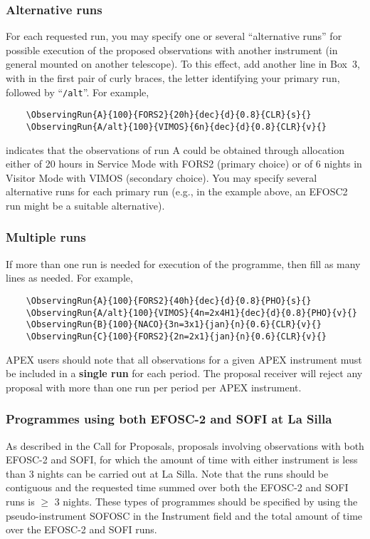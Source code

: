 \documentclass{article}
\begin{document}
\subsubsection*{Alternative runs}
For each requested run, you may specify one or several
``alternative runs'' for possible execution of the proposed
observations with another instrument (in general mounted on another
telescope). To this effect, add another line in Box~3, with in the
first pair of curly braces, the letter identifying your primary run,
followed by ``\verb|/alt|''. For example,
\begin{verbatim}
    \ObservingRun{A}{100}{FORS2}{20h}{dec}{d}{0.8}{CLR}{s}{}
    \ObservingRun{A/alt}{100}{VIMOS}{6n}{dec}{d}{0.8}{CLR}{v}{}
\end{verbatim}
indicates that the observations of run A could be obtained
through allocation either of 20 hours in Service Mode with FORS2
(primary choice) or of 6 nights in Visitor Mode with VIMOS (secondary
choice). You may specify several alternative runs for each primary run
(e.g., in the example above, an EFOSC2 run might be a suitable alternative).

\subsubsection*{Multiple runs}
If more than one run is needed for execution of
the programme, then fill as many lines as needed.  For example,
\begin{verbatim} 
    \ObservingRun{A}{100}{FORS2}{40h}{dec}{d}{0.8}{PHO}{s}{}
    \ObservingRun{A/alt}{100}{VIMOS}{4n=2x4H1}{dec}{d}{0.8}{PHO}{v}{}
    \ObservingRun{B}{100}{NACO}{3n=3x1}{jan}{n}{0.6}{CLR}{v}{}
    \ObservingRun{C}{100}{FORS2}{2n=2x1}{jan}{n}{0.6}{CLR}{v}{}
\end{verbatim}

APEX users should note that all observations for a given APEX
instrument must be included in a {\bf single run} for each period. The proposal
receiver 
will reject any proposal with more than one run per period per APEX instrument. 

\subsubsection*{Programmes using both EFOSC-2 and SOFI at La Silla}
\label{sec:sofiefosc}

As described in the Call for Proposals,
proposals involving observations with both EFOSC-2 and SOFI,
for which the amount of time with either instrument is less than
3 nights can be carried out at La Silla.
Note that the runs should be contiguous and the requested time
summed over both the EFOSC-2 and SOFI runs is $\ge$ 3 nights.
These types of programmes should be specified
by using the pseudo-instrument SOFOSC in the Instrument field and
the total amount of time over the EFOSC-2 and SOFI runs.
\end{document}
